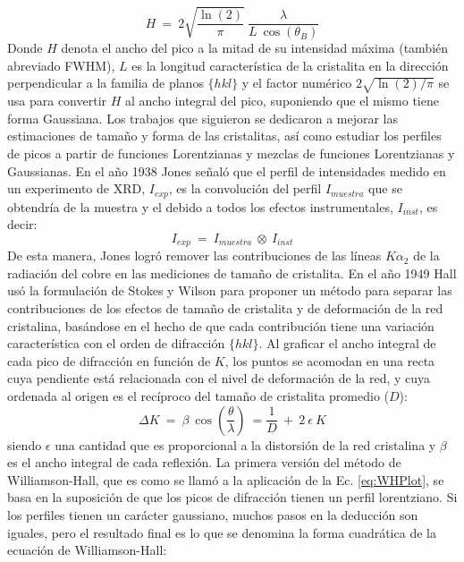 \begin{equation}
  H \ = \ 2 \sqrt{\frac{\ln(2)}{\pi}} \ \frac{\lambda}{L \ \cos(\theta_B)}
  \label{eq:Scherrer}
\end{equation}
\noindent
Donde $H$ denota el ancho del pico a la mitad de su intensidad máxima (también abreviado FWHM), $L$ es la longitud característica de la cristalita en la dirección perpendicular a la familia de planos $\{hkl\}$ y el factor numérico $2\sqrt{\ln(2)/\pi}$ se usa para convertir $H$ al ancho integral del pico, suponiendo que el mismo tiene forma Gaussiana.
Los trabajos que siguieron se dedicaron a mejorar las estimaciones de tamaño y forma de las cristalitas, así como estudiar los perfiles de picos a partir de funciones Lorentzianas y mezclas de funciones Lorentzianas y Gaussianas.
En el año 1938 Jones\cite{Jones16} señaló que el perfil de intensidades medido en un experimento de XRD, $I_{exp}$, es la convolución del perfil $I_{muestra}$ que se obtendría de la muestra y el debido a todos los efectos instrumentales, $I_{inst}$, es decir:
\begin{equation}
  I_{exp} \ = \ I_{muestra} \ \otimes \ I_{inst}
  \label{eq:conv}
\end{equation}
\noindent
De esta manera, Jones logró remover las contribuciones de las líneas $K\alpha_2$ de la radiación del cobre en las mediciones de tamaño de cristalita.
En el año 1949 Hall\cite{WHHall1949} usó la formulación de Stokes y Wilson para proponer un método para separar las contribuciones de los efectos de tamaño de cristalita y de deformación de la red cristalina, basándose en el hecho de que cada contribución tiene una variación característica con el orden de difracción $\{hkl\}$.
Al graficar el ancho integral de cada pico de difracción en función de $K$, los puntos se acomodan en una recta cuya pendiente está relacionada con el nivel de deformación de la red, y cuya ordenada al origen es el recíproco del tamaño de cristalita promedio ($D$):
\begin{equation}
  \Delta K \ = \  \beta \ \cos\left(\frac{\theta}{\lambda}\right) \ = \frac{1}{D} \ + \ 2 \ \epsilon \ K
  \label{eq:WHPlot}
\end{equation}
\noindent
siendo $\epsilon$ una cantidad que es proporcional a la distorsión de la red cristalina y $\beta$ es el ancho integral de cada reflexión.
La primera versión del método de Williamson-Hall, que es como se llamó a la aplicación de la Ec. \ref{eq:WHPlot}, se basa en la suposición de que los picos de difracción tienen un perfil lorentziano.
Si los perfiles tienen un carácter gaussiano, muchos pasos en la deducción son iguales, pero el resultado final es lo que se denomina la forma cuadrática de la ecuación de Williamson-Hall\cite{Scardi2004}:
